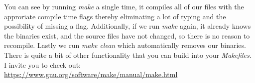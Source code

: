 \documentclass[../main.tex]{subfiles}
\begin{document}
You can see by running \textit{make} a single time, it compiles all of our files with the approriate compile time flags thereby eliminating a lot of typing and the possibility of missing a flag.  Additionally, if we run \textit{make} again, it already knows the binaries exist, and the source files have not changed, so there is no reason to recompile.  Lastly we run \textit{make clean} which automatically removes our binaries.  There is quite a bit of other functionality that you can build into your \textit{Makefiles}.  I invite you to check out: \href{https://www.gnu.org/software/make/manual/make.html}{https://www.gnu.org/software/make/manual/make.html}
\end{document}

